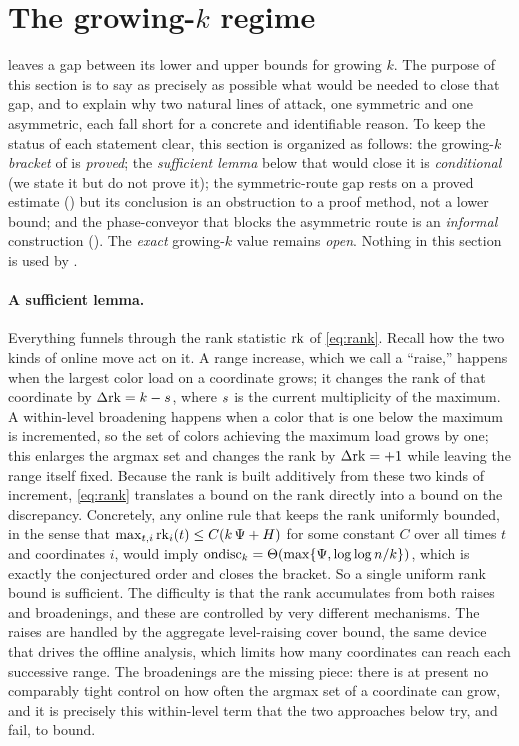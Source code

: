 \section{The growing-$k$ regime}\label{sec:open}

 leaves a gap between its lower and upper bounds for growing $k$. The purpose of this section is to say as
precisely as possible what would be needed to close that gap, and to explain why two natural lines of attack, one symmetric
and one asymmetric, each fall short for a concrete and identifiable reason. To keep the status of each statement clear, this
section is organized as follows: the growing-$k$ \emph{bracket} of  is \emph{proved}; the \emph{sufficient
lemma} below that would close it is \emph{conditional} (we state it but do not prove it); the symmetric-route gap rests on a
proved estimate () but its conclusion is an obstruction to a proof method, not a lower bound; and the
phase-conveyor that blocks the asymmetric route is an \emph{informal} construction (). The \emph{exact}
growing-$k$ value remains \emph{open}. Nothing in this section is used by .

\paragraph{A sufficient lemma.}
Everything funnels through the rank statistic $\mathrm{rk}$ of \eqref{eq:rank}. Recall how the two kinds of online move act on it.
A range increase, which we call a ``raise,'' happens when the largest color load on a coordinate grows; it changes the rank
of that coordinate by $\Delta\mathrm{rk}=k-s$, where $s$ is the current multiplicity of the maximum. A within-level
broadening happens when a color that is one below the maximum is incremented, so the set of colors achieving the maximum
load grows by one; this enlarges the argmax set and changes the rank by $\Delta\mathrm{rk}=+1$ while leaving the range itself
fixed. Because the rank is built additively from these two kinds of increment, \eqref{eq:rank} translates a bound on the
rank directly into a bound on the discrepancy. Concretely, any online rule that keeps the rank uniformly bounded, in the
sense that $\max_{t,i}\mathrm{rk}_i(t)\le C(k\,\Psi+H)$ for some constant $C$ over all times $t$ and coordinates $i$,
would imply $\mathrm{ondisc}_k=\Theta(\max\{\Psi,\log\log n/k\})$, which is exactly the conjectured order and closes the bracket. So a
single uniform rank bound is sufficient. The difficulty is that the rank accumulates from both raises and broadenings, and
these are controlled by very different mechanisms. The raises are handled by the aggregate level-raising cover bound, the
same device that drives the offline analysis, which limits how many coordinates can reach each successive range. The
broadenings are the missing piece: there is at present no comparably tight control on how often the argmax set of a
coordinate can grow, and it is precisely this within-level term that the two approaches below try, and fail, to bound.


